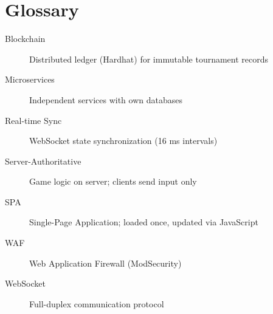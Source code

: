 \documentclass[11pt,a4paper]{report}
\begin{document}
\chapter{Glossary}
\label{app:glossary}

\begin{description}
  \item[Blockchain] Distributed ledger (Hardhat) for immutable tournament records
  \item[Microservices] Independent services with own databases
  \item[Real-time Sync] WebSocket state synchronization (16 ms intervals)
  \item[Server-Authoritative] Game logic on server; clients send input only
  \item[SPA] Single-Page Application; loaded once, updated via JavaScript
  \item[WAF] Web Application Firewall (ModSecurity)
  \item[WebSocket] Full-duplex communication protocol
\end{description}
\end{document}
